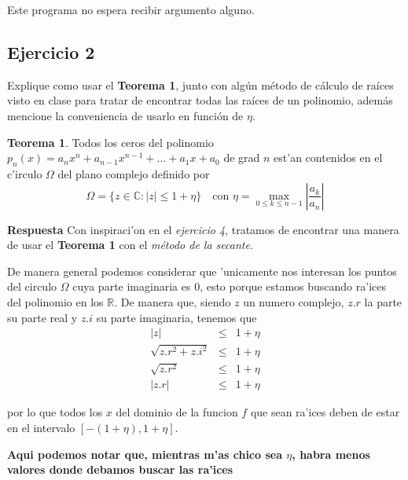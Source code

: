 \documentclass[11pt]{article}
\begin{document}
	Este programa no espera recibir argumento alguno.















\newpage
    \hypertarget{ejercicio-2}{%
\subsection{Ejercicio 2}\label{ejercicio-2}}

		Explique como usar el \textbf{Teorema 1}, junto con alg\'un m\'etodo de
	c\'alculo de ra\'ices visto en clase para tratar de encontrar todas las
	ra\'ices de un polinomio, adem\'as mencione la conveniencia de usarlo en
	funci\'on de \(\eta\).

	\textbf{Teorema 1}. Todos los ceros del polinomio
	\(p_n(x) = a_{n}x^{n} + a_{n-1}x^{n-1} +\dots+ a_1x + a_0\) de grad
	\(n\) est'an contenidos en el c'irculo \(\Omega\) del plano complejo
	definido por
	\begin{equation*} \Omega =\{ z\in\mathbb C: |z| \leq 1 + \eta \} \quad\text{con }\eta = \max_{0\leq k\leq n-1}\left| \frac{a_k}{a_n}\right| 
	\end{equation*}

		\textbf{Respuesta} Con inspiraci'on en el \textit{ejercicio 4}, tratamos
	de encontrar una manera de usar el \textbf{Teorema 1} con el
	\textit{m\'etodo de la secante}.

	De manera general podemos considerar que 'unicamente nos interesan los
	puntos del circulo \(\Omega\) cuya parte imaginaria es \(0\), esto
	porque estamos buscando ra'ices del polinomio en los \(\mathbb R\). De
	manera que, siendo \(z\) un numero complejo, \(z.r\) la parte su parte
	real y \(z.i\) su parte imaginaria, tenemos que \begin{eqnarray*}
		|z| &\leq& 1+ \eta \\
		\sqrt{z.r^2 + z.i^2} &\leq& 1+ \eta \\
		\sqrt{z.r^2} &\leq& 1+\eta \\
		|z.r| &\leq& 1+\eta
	\end{eqnarray*}

	por lo que todos los \(x\) del dominio de la funcion \(f\) que sean
	ra'ices deben de estar en el intervalo \([-(1+\eta), 1+\eta]\).

	\textbf{Aqui podemos notar que, mientras m'as chico sea \(\eta\), habra
	menos valores donde debamos buscar las ra'ices}
\end{document}
